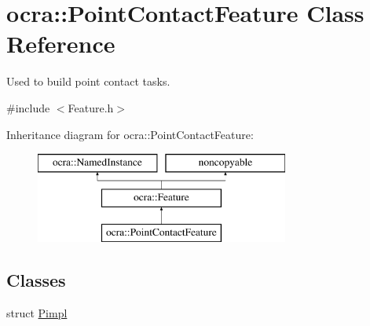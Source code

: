 \hypertarget{classocra_1_1PointContactFeature}{}\section{ocra\+:\+:Point\+Contact\+Feature Class Reference}
\label{classocra_1_1PointContactFeature}


Used to build point contact tasks.  




{\ttfamily \#include $<$Feature.\+h$>$}

Inheritance diagram for ocra\+:\+:Point\+Contact\+Feature\+:\begin{figure}[H]
\begin{center}
\leavevmode
\includegraphics[height=3.000000cm]{d4/d58/classocra_1_1PointContactFeature}
\end{center}
\end{figure}
\subsection*{Classes}
\begin{DoxyCompactItemize}
\item 
struct \hyperlink{structocra_1_1PointContactFeature_1_1Pimpl}{Pimpl}
\end{DoxyCompactItemize}
